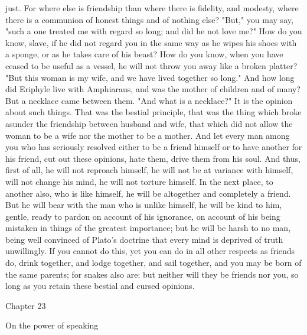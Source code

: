 \documentclass[a4paper]{article}
\begin{document}
just. For where else is friendship than where there is fidelity, and modesty,
where there is a communion of honest things and of nothing else?
    "But," you may say, "such a one treated me with regard so long; and did he
not love me?" How do you know, slave, if he did not regard you in the same way
as he wipes his shoes with a sponge, or as he takes care of his beast? How do
you know, when you have ceased to be useful as a vessel, he will not throw you
away like a broken platter? "But this woman is my wife, and we have lived
together so long." And how long did Eriphyle live with Amphiaraus, and was the
mother of children and of many? But a necklace came between them. "And what is
a necklace?" It is the opinion about such things. That was the bestial
principle, that was the thing which broke asunder the friendship between
husband and wife, that which did not allow the woman to be a wife nor the
mother to be a mother. And let every man among you who has seriously resolved
either to be a friend himself or to have another for his friend, cut out these
opinions, hate them, drive them from his soul. And thus, first of all, he will
not reproach himself, he will not be at variance with himself, will not change
his mind, he will not torture himself. In the next place, to another also, who
is like himself, he will be altogether and completely a friend. But he will
bear with the man who is unlike himself, he will be kind to him, gentle, ready
to pardon on account of his ignorance, on account of his being mistaken in
things of the greatest importance; but he will be harsh to no man, being well
convinced of Plato's doctrine that every mind is deprived of truth unwillingly.
If you cannot do this, yet you can do in all other respects as friends do,
drink together, and lodge together, and sail together, and you may be born of
the same parents; for snakes also are: but neither will they be friends nor
you, so long as you retain these bestial and cursed opinions.

Chapter 23

On the power of speaking
\end{document}
